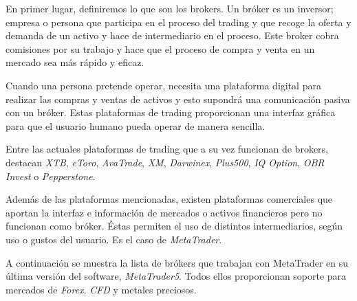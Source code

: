 En primer lugar, definiremos lo que son los brokers. Un bróker es un inversor; empresa o persona que participa en el proceso del trading y que recoge la oferta y demanda de un activo y hace de intermediario en el proceso. Este broker cobra comisiones por su trabajo y hace que el proceso de compra y venta en un mercado sea más rápido y eficaz. \newline

Cuando una persona pretende operar, necesita una plataforma digital para realizar las compras y ventas de activos y esto supondrá una comunicación pasiva con un bróker. Estas plataformas de trading proporcionan una interfaz gráfica para que el usuario humano pueda operar de manera sencilla. \newline

Entre las actuales plataformas de trading que a su vez funcionan de brokers, destacan \textit{XTB}, \textit{eToro}, \textit{AvaTrade}, \textit{XM}, \textit{Darwinex}, \textit{Plus500}, \textit{IQ Option}, \textit{OBR Invest} o \textit{Pepperstone}. \newline

Además de las plataformas mencionadas, existen plataformas comerciales que aportan la interfaz e información de mercados o activos financieros pero no funcionan como bróker. Éstas permiten el uso de distintos intermediarios, según uso o gustos del usuario. Es el caso de \textit{MetaTrader}. \newline

A continuación se muestra la lista de brókers que trabajan con MetaTrader en su última versión del software, \textit{MetaTrader5}. Todos ellos proporcionan soporte para mercados de \textit{Forex}, \textit{CFD} y metales preciosos. \newline

\label{brokers}

